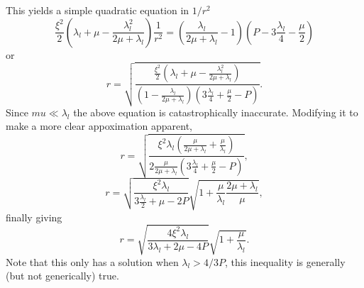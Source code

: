 This yields a simple quadratic equation in $1/r^2$
\begin{equation}
\frac{\xi^2}{2}\left(\lambda_l + \mu - \frac{\lambda_l^2}{2\mu + \lambda_l}\right)\frac{1}{r^2} = \left(\frac{\lambda_l}{2\mu + \lambda_l} - 1\right)\left(P - 3\frac{\lambda_l}{4} - \frac{\mu}{2}\right)
\label{eq:quadraticBHRadius2}
\end{equation}
or
\begin{equation}
r = \sqrt{
\frac{\frac{\xi^2}{2}\left(\lambda_l + \mu - \frac{\lambda_l^2}{2\mu + \lambda_l}\right)}{\left(1 - \frac{\lambda_l}{2\mu + \lambda_l}\right)\left(3\frac{\lambda_l}{4} + \frac{\mu}{2} - P\right)}
}.
\label{eq:quadraticBHRadius2}
\end{equation}
Since $mu\ll\lambda_l$ the above equation is catastrophically inaccurate. Modifying it to make a more clear appoximation apparent,
\begin{equation}
r = \sqrt{
\frac{\xi^2\lambda_l\left(\frac{\mu}{2\mu + \lambda_l} + \frac{\mu}{\lambda_l}\right)}{2\frac{\mu}{2\mu + \lambda_l}\left(3\frac{\lambda_l}{4} + \frac{\mu}{2} - P\right)}
},
\label{eq:quadraticBHRadius3}
\end{equation}
\begin{equation}
r = \sqrt{\frac{\xi^2\lambda_l}{3\frac{\lambda_l}{2} + \mu - 2P}}\sqrt{1 + \frac{\mu}{\lambda_l}\frac{2\mu + \lambda_l}{\mu}},
\label{eq:quadraticBHRadius4}
\end{equation}
finally giving
\begin{equation}
r = \sqrt{\frac{4\xi^2\lambda_l}{3\lambda_l + 2\mu - 4P}}\sqrt{1 + \frac{\mu}{\lambda_l}}.
\label{eq:quadraticBHRadius5}
\end{equation}
Note that this only has a solution when $\lambda_l > 4/3P$, this inequality is generally (but not generically) true.